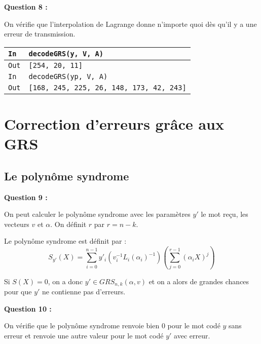 \documentclass[titlepage]{article}
\begin{document}
        \textbf{Question 8 :}

        On vérifie que l'interpolation de Lagrange donne n'importe quoi dès qu'il y a une erreur de transmission.
        \bigbreak

        \begin{tabularx}{12cm}{|p{0.60cm}|X|}
            \hline
            \rowcolor{gray}
            \texttt{In}
            & 
            \texttt{decodeGRS(y, V, A)}
            \\
            \hline
            \texttt{Out}
            &
            \texttt{[254, 20, 11]}
            \\
            \hline
            \rowcolor{gray}
            \texttt{In}
            & 
            \texttt{decodeGRS(yp, V, A)}
            \\
            \hline
            \texttt{Out}
            &
            \texttt{[168, 245, 225, 26, 148, 173, 42, 243]}
            \\
            \hline
        \end{tabularx}
        \bigbreak

    \section{Correction d’erreurs grâce aux GRS}
        \subsection{Le polynôme syndrome}
        \textbf{Question 9 :}

        On peut calculer le polynôme syndrome avec les paramètres $y'$ le mot reçu, les vecteurs $v$ et $\alpha$.
        On définit $r$ par $r = n - k$.

        Le polynôme syndrome est définit par : 
        \[S_{y'}(X) = \sum_{i = 0}^{n - 1}y'_i(v_i^{-1}L_i(\alpha_i)^{-1})(\sum_{j = 0}^{r - 1}(\alpha_iX)^j)\]

        Si $S(X) = 0$, on a donc $y' \in GRS_{n,k}(\alpha,v)$ et on a alors de grandes chances pour que $y'$ ne contienne pas d'erreurs.

        

        \textbf{Question 10 :}

        On vérifie que le polynôme syndrome renvoie bien $0$ pour le mot codé $y$ sans erreur et renvoie une autre valeur pour le mot codé $y'$ avec erreur.
        
\end{document}
